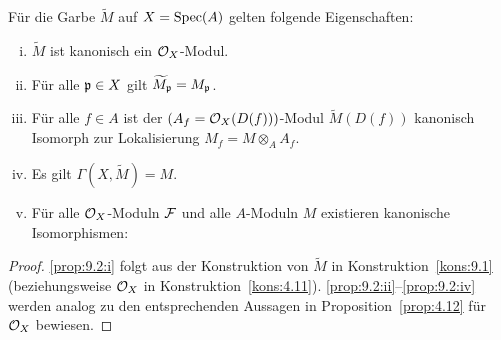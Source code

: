 \begin{prop}
\label{prop:9.2}
	Für die Garbe $\widetilde{M}$ auf $X=\operatorname{Spec}(A)$ gelten folgende Eigenschaften:
	\begin{enumerate}[i)]
		\item\label{prop:9.2:i} $\widetilde{M}$ ist kanonisch ein $\mathcal{O}_X$-Modul.
		\item\label{prop:9.2:ii} Für alle $\mathfrak{p} \in X$ gilt $\widetilde{M}_{\mathfrak{p}} = M_{\mathfrak{p}}$.
		\item\label{prop:9.2:iii} Für alle $f \in A$ ist der $(A_f = \mathcal{O}_X(D(f)))$-Modul $\widetilde{M}(D(f))$ kanonisch Isomorph zur Lokalisierung $M_f = M \otimes_A A_f$.
		\item\label{prop:9.2:iv} Es gilt $\Gamma(X,\widetilde{M}) = M$.
		\item\label{prop:9.2:v} Für alle $\mathcal{O}_X$-Moduln $\mathcal{F}$ und alle $A$-Moduln $M$ existieren kanonische Isomorphismen:
		\begin{center}
		\end{center}
	\end{enumerate}
	\begin{proof}
		\ref{prop:9.2:i} folgt aus der Konstruktion von $\widetilde{M}$ in Konstruktion~\ref{kons:9.1} (beziehungsweise $\mathcal{O}_X$ in Konstruktion~\ref{kons:4.11}). \ref{prop:9.2:ii}--\ref{prop:9.2:iv} werden analog zu den entsprechenden Aussagen in Proposition~\ref{prop:4.12} für $\mathcal{O}_X$ bewiesen.


\end{proof}
\end{prop}

